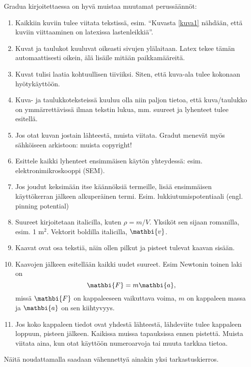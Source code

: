 \documentclass{wihuri}
\begin{document}
Gradua kirjoitettaessa on hyvä muistaa muutamat perussäännöt:
\begin{enumerate}
\item Kaikkiin
kuviin tulee viitata tekstissä, esim. ``Kuvasta \ref{kuva1} nähdään,
että kuviin viittaaminen on latexissa lastenleikkiä''.
\item Kuvat ja taulukot kuuluvat oikeasti sivujen ylälaitaan. Latex
  tekee tämän automaattisesti oikein, älä lisäile mitään paikkamääreitä.
\item Kuvat tulisi laatia kohtuullisen tiiviiksi. Siten, että kuva-ala
  tulee kokonaan hyötykäyttöön.
\item Kuva- ja taulukkoteksteissä kuuluu olla niin paljon tietoa, että
  kuva/taulukko on ymmärrettävissä ilman tekstin lukua, mm. suureet ja
  lyhenteet tulee esitellä.
\item Jos otat kuvan jostain lähteestä, muista viitata. Gradut menevät
  myös sähköiseen arkistoon: muista copyright!
\item Esittele kaikki lyhenteet ensimmäisen käytön yhteydessä:
  esim. elektronimikroskooppi (SEM).
\item Jos joudut keksimään itse käännöksiä termeille, lisää
  ensimmäisen käyttökerran jälkeen alkuperäinen
  termi. Esim. lukkiutumispotentiaali (engl. pinning potential)
\item Suureet kirjoitetaan italicilla, kuten $\rho = m/V$. Yksiköt sen
  sijaan romanilla, esim. 1 m$^2$. Vektorit boldilla italicilla,
  $\mathbi{v}$.
\item Kaavat ovat osa tekstiä, näin ollen pilkut ja pisteet tulevat
  kaavan sisään.
\item Kaavojen jälkeen esitellään kaikki uudet suureet. Esim Newtonin
  toinen laki on 
\begin{equation}
\mathbi{F} = m\mathbi{a},
\end{equation}
missä $\mathbi{F}$ on kappaleeseen vaikuttava voima, $m$ on kappaleen
massa ja $\mathbi{a}$ on sen kiihtyvyys.
\item Jos koko kappaleen tiedot ovat yhdestä lähteestä, lähdeviite
  tulee kappaleen loppuun, pisteen jälkeen. Kaikissa muissa
  tapauksissa ennen pistettä. Muista viitata aina, kun otat käyttöön 
  numeroarvoja tai muuta tarkkaa tietoa.
\end{enumerate}

Näitä noudattamalla saadaan vähennettyä ainakin yksi tarkastuskierros.

\fi
\end{document}
